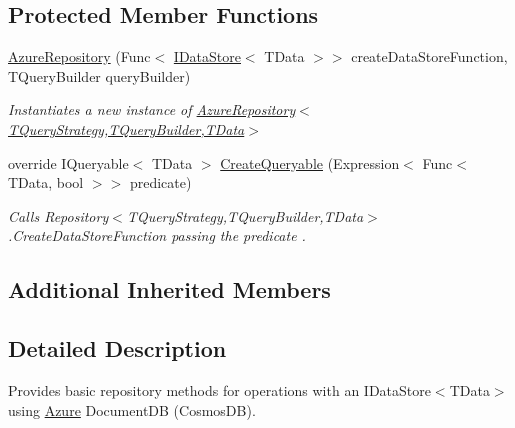 \subsection*{Protected Member Functions}
\begin{DoxyCompactItemize}
\item 
\hyperlink{classCqrs_1_1Azure_1_1DocumentDb_1_1Repositories_1_1AzureRepository_a0cd5703c46fde3eeefcb02b1d0113640_a0cd5703c46fde3eeefcb02b1d0113640}{Azure\+Repository} (Func$<$ \hyperlink{interfaceCqrs_1_1DataStores_1_1IDataStore}{I\+Data\+Store}$<$ T\+Data $>$$>$ create\+Data\+Store\+Function, T\+Query\+Builder query\+Builder)
\begin{DoxyCompactList}\small\item\em Instantiates a new instance of \hyperlink{classCqrs_1_1Azure_1_1DocumentDb_1_1Repositories_1_1AzureRepository_a0cd5703c46fde3eeefcb02b1d0113640_a0cd5703c46fde3eeefcb02b1d0113640}{Azure\+Repository$<$\+T\+Query\+Strategy,\+T\+Query\+Builder,\+T\+Data$>$} \end{DoxyCompactList}\item 
override I\+Queryable$<$ T\+Data $>$ \hyperlink{classCqrs_1_1Azure_1_1DocumentDb_1_1Repositories_1_1AzureRepository_ac9ceeed80a02ced9a45b3443cd1f453f_ac9ceeed80a02ced9a45b3443cd1f453f}{Create\+Queryable} (Expression$<$ Func$<$ T\+Data, bool $>$$>$ predicate)
\begin{DoxyCompactList}\small\item\em Calls Repository$<$\+T\+Query\+Strategy,\+T\+Query\+Builder,\+T\+Data$>$.\+Create\+Data\+Store\+Function passing the {\itshape predicate} . \end{DoxyCompactList}\end{DoxyCompactItemize}
\subsection*{Additional Inherited Members}


\subsection{Detailed Description}
Provides basic repository methods for operations with an I\+Data\+Store$<$\+T\+Data$>$ using \hyperlink{namespaceCqrs_1_1Azure}{Azure} Document\+DB (Cosmos\+DB). 


